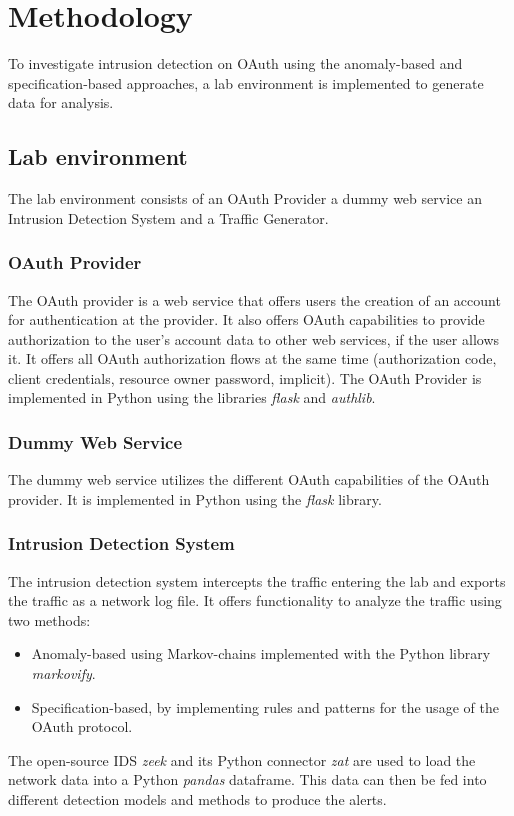 \documentclass{article}
\begin{document}
\section{Methodology}
To investigate intrusion detection on OAuth using the anomaly-based and specification-based approaches, a lab environment is implemented to generate data for analysis.

\subsection{Lab environment}
The lab environment consists of an OAuth Provider a dummy web service an Intrusion Detection System and a Traffic Generator.

\subsubsection{OAuth Provider}
The OAuth provider is a web service that offers users the creation of an account for authentication at the provider. It also offers OAuth capabilities to provide authorization to the user's account data to other web services, if the user allows it. It offers all OAuth authorization flows at the same time (authorization code, client credentials, resource owner password, implicit). The OAuth Provider is implemented in Python using the libraries \emph{flask} and \emph{authlib}.

\subsubsection{Dummy Web Service}
The dummy web service utilizes the different OAuth capabilities of the OAuth provider. It is implemented in Python using the \emph{flask} library.

\subsubsection{Intrusion Detection System}
The intrusion detection system intercepts the traffic entering the lab and exports the traffic as a network log file. It offers functionality to analyze the traffic using two methods:

\begin{itemize}
    \item Anomaly-based using Markov-chains implemented with the Python library \emph{markovify}.
    \item Specification-based, by implementing rules and patterns for the usage of the OAuth protocol.
\end{itemize}
The open-source IDS \emph{zeek} and its Python connector \emph{zat} are used to load the network data into a Python \emph{pandas} dataframe. This data can then be fed into different detection models and methods to produce the alerts.
\end{document}
